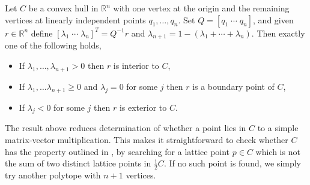 \documentclass[oneside,hidelinks,indentfirst,10pt]{book}
\begin{document}
\begin{cor}
Let \(C\) be a convex hull in \(\mathbb{R}^n\) with one vertex at the origin and the remaining vertices at linearly independent points \(q_1,\dots,q_n\). Set \(Q=[q_1\;\cdots\;q_n]\), and given \(r\in\mathbb{R}^n\) define \([\lambda_1\;\cdots\;\lambda_n]^T=Q^{-1}r\) and \(\lambda_{n+1}=1-(\lambda_1+\cdots+\lambda_n)\). Then exactly one of the following holds,
\begin{itemize}
    \item[(1)] If \(\lambda_1,\dots,\lambda_{n+1}>0\) then \(r\) is interior to \(C\),
    \item[(2)] If \(\lambda_1,\dots\lambda_{n+1}\geq0\) and \(\lambda_j=0\) for some \(j\) then \(r\) is a boundary point of \(C\),
    \item[(3)] If \(\lambda_j<0\) for some \(j\) then \(r\) is exterior to \(C\).
\end{itemize}
\end{cor}


The result above reduces determination of whether a point lies in \(C\) to a simple matrix-vector multiplication. This makes it straightforward to check whether \(C\) has the property outlined in , by searching for a lattice point \(p\in C\) which is not the sum of two distinct lattice points in \(\frac{1}{2}C\). If no such point is found, we simply try another polytope with \(n+1\) vertices. 


\end{document}
